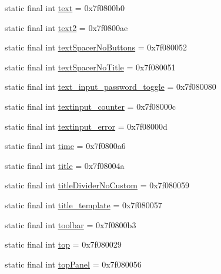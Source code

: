 \begin{CompactItemize}
\item 
static final int \hyperlink{classandroid_1_1support_1_1v7_1_1mediarouter_1_1_r_1_1id_e90221ec2b40a096aade1c4bad84986e}{text} = 0x7f0800b0
\item 
static final int \hyperlink{classandroid_1_1support_1_1v7_1_1mediarouter_1_1_r_1_1id_62ef947334d71d3723b98e5652193971}{text2} = 0x7f0800ae
\item 
static final int \hyperlink{classandroid_1_1support_1_1v7_1_1mediarouter_1_1_r_1_1id_62810d51b00ebb19ae3c3bde1da32b63}{textSpacerNoButtons} = 0x7f080052
\item 
static final int \hyperlink{classandroid_1_1support_1_1v7_1_1mediarouter_1_1_r_1_1id_64c3344bc2ee36520270b4df94beca1b}{textSpacerNoTitle} = 0x7f080051
\item 
static final int \hyperlink{classandroid_1_1support_1_1v7_1_1mediarouter_1_1_r_1_1id_bcbda5eeb71aff782d9b2b06af2b4b94}{text\_\-input\_\-password\_\-toggle} = 0x7f080080
\item 
static final int \hyperlink{classandroid_1_1support_1_1v7_1_1mediarouter_1_1_r_1_1id_16269b185e2dc417fed58bd0955ba196}{textinput\_\-counter} = 0x7f08000c
\item 
static final int \hyperlink{classandroid_1_1support_1_1v7_1_1mediarouter_1_1_r_1_1id_2dd6e86aa87da0a308a88b81b4b9a428}{textinput\_\-error} = 0x7f08000d
\item 
static final int \hyperlink{classandroid_1_1support_1_1v7_1_1mediarouter_1_1_r_1_1id_2f47c7a7d40ed8bd90233a984917eb4a}{time} = 0x7f0800a6
\item 
static final int \hyperlink{classandroid_1_1support_1_1v7_1_1mediarouter_1_1_r_1_1id_12e8ac0a00dc4e29d6ae72c51349c5c8}{title} = 0x7f08004a
\item 
static final int \hyperlink{classandroid_1_1support_1_1v7_1_1mediarouter_1_1_r_1_1id_0072c97d43880f2a44198e12f8a3cec6}{titleDividerNoCustom} = 0x7f080059
\item 
static final int \hyperlink{classandroid_1_1support_1_1v7_1_1mediarouter_1_1_r_1_1id_326e0e2d6655d61ddaf76411aee4afce}{title\_\-template} = 0x7f080057
\item 
static final int \hyperlink{classandroid_1_1support_1_1v7_1_1mediarouter_1_1_r_1_1id_97d013237f74910762b6a527932ab91e}{toolbar} = 0x7f0800b3
\item 
static final int \hyperlink{classandroid_1_1support_1_1v7_1_1mediarouter_1_1_r_1_1id_b25e076450211e2860740b2d04912b6b}{top} = 0x7f080029
\item 
static final int \hyperlink{classandroid_1_1support_1_1v7_1_1mediarouter_1_1_r_1_1id_c9cfd910444ac5173d787c346b60468c}{topPanel} = 0x7f080056

\end{CompactItemize}
